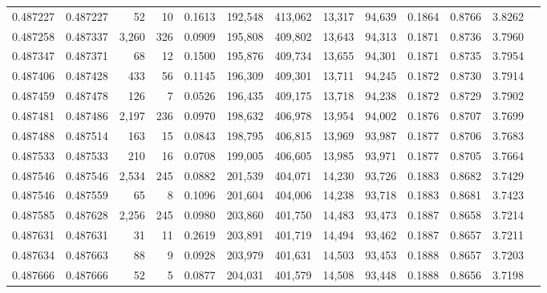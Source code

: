 \begin{tabular}{rrrrrrrrrrrrr}
0.487227 & 0.487227 &    52 &    10 &                                     0.1613 & 192,548 & 413,062 &  13,317 &  94,639 & 0.1864 & 0.8766 & 3.8262 \\
0.487258 & 0.487337 & 3,260 &   326 &                                     0.0909 & 195,808 & 409,802 &  13,643 &  94,313 & 0.1871 & 0.8736 & 3.7960 \\
0.487347 & 0.487371 &    68 &    12 &                                     0.1500 & 195,876 & 409,734 &  13,655 &  94,301 & 0.1871 & 0.8735 & 3.7954 \\
0.487406 & 0.487428 &   433 &    56 &                                     0.1145 & 196,309 & 409,301 &  13,711 &  94,245 & 0.1872 & 0.8730 & 3.7914 \\
0.487459 & 0.487478 &   126 &     7 &                                     0.0526 & 196,435 & 409,175 &  13,718 &  94,238 & 0.1872 & 0.8729 & 3.7902 \\
0.487481 & 0.487486 & 2,197 &   236 &                                     0.0970 & 198,632 & 406,978 &  13,954 &  94,002 & 0.1876 & 0.8707 & 3.7699 \\
0.487488 & 0.487514 &   163 &    15 &                                     0.0843 & 198,795 & 406,815 &  13,969 &  93,987 & 0.1877 & 0.8706 & 3.7683 \\
0.487533 & 0.487533 &   210 &    16 &                                     0.0708 & 199,005 & 406,605 &  13,985 &  93,971 & 0.1877 & 0.8705 & 3.7664 \\
0.487546 & 0.487546 & 2,534 &   245 &                                     0.0882 & 201,539 & 404,071 &  14,230 &  93,726 & 0.1883 & 0.8682 & 3.7429 \\
0.487546 & 0.487559 &    65 &     8 &                                     0.1096 & 201,604 & 404,006 &  14,238 &  93,718 & 0.1883 & 0.8681 & 3.7423 \\
0.487585 & 0.487628 & 2,256 &   245 &                                     0.0980 & 203,860 & 401,750 &  14,483 &  93,473 & 0.1887 & 0.8658 & 3.7214 \\
0.487631 & 0.487631 &    31 &    11 &                                     0.2619 & 203,891 & 401,719 &  14,494 &  93,462 & 0.1887 & 0.8657 & 3.7211 \\
0.487634 & 0.487663 &    88 &     9 &                                     0.0928 & 203,979 & 401,631 &  14,503 &  93,453 & 0.1888 & 0.8657 & 3.7203 \\
0.487666 & 0.487666 &    52 &     5 &                                     0.0877 & 204,031 & 401,579 &  14,508 &  93,448 & 0.1888 & 0.8656 & 3.7198 \\

\end{tabular}
